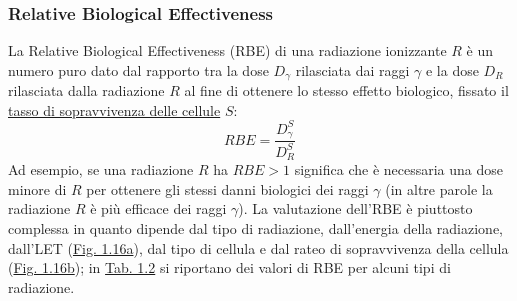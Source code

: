 \documentclass[12pt,a4paper,twoside]{report}
\begin{document}
	\subsubsection{Relative Biological Effectiveness}\label{par:rbe}
	La Relative Biological Effectiveness (RBE) di una radiazione ionizzante $R$ è un numero puro dato dal rapporto tra la dose $D_\gamma$ rilasciata dai raggi $\gamma$ e la dose $D_R$ rilasciata dalla radiazione $R$ al fine di ottenere lo stesso effetto biologico, fissato il \hyperref[sec:sopravvivenza_cellulare]{tasso di sopravvivenza delle cellule} $S$:
	\begin{equation}
		RBE=\frac{D^S_\gamma}{D^S_R}
		\label{eq:rbe}
	\end{equation}
	Ad esempio, se una radiazione $R$ ha $RBE>1$ significa che è necessaria una dose minore di $R$ per ottenere gli stessi danni biologici dei raggi $\gamma$ (in altre parole la radiazione $R$ è più efficace dei raggi $\gamma$). La valutazione dell'RBE è piuttosto complessa in quanto dipende dal tipo di radiazione, dall'energia della radiazione, dall'LET (\hyperref[fig:let_rbe]{Fig. 1.16a}), dal tipo di cellula e dal rateo di sopravvivenza della cellula (\hyperref[fig:survival_dose]{Fig. 1.16b}); in \hyperref[tab:let_rbe]{Tab. 1.2} si riportano dei valori di RBE per alcuni tipi di radiazione.
\end{document}
